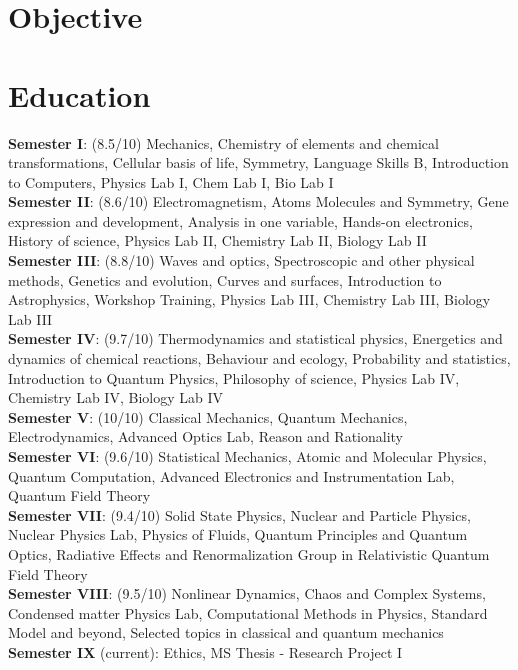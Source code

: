 \documentclass[11pt,a4paper,unicode]{moderncv}
\begin{document}
\maketitle


\section{Objective}

\section{Education}
	{
	\textbf{Semester I}: (8.5/10) Mechanics, Chemistry of elements and chemical transformations, Cellular basis of life, Symmetry, Language Skills B, Introduction to Computers, Physics Lab I, Chem Lab I, Bio Lab I\\
	\textbf{Semester II}: (8.6/10) Electromagnetism, Atoms Molecules and Symmetry, Gene expression and development, Analysis in one variable, Hands-on electronics, History of science, Physics Lab II, Chemistry Lab II, Biology Lab II\\
	\textbf{Semester III}: (8.8/10) Waves and optics, Spectroscopic and other physical methods, Genetics and evolution, Curves and surfaces, Introduction to Astrophysics, Workshop Training, Physics Lab III, Chemistry Lab III, Biology Lab III\\
	\textbf{Semester IV}: (9.7/10) Thermodynamics and statistical physics, Energetics and dynamics of chemical reactions, Behaviour and ecology, Probability and statistics, Introduction to Quantum Physics, Philosophy of science, Physics Lab IV, Chemistry Lab IV, Biology Lab IV\\
	\textbf{Semester V}: (10/10) Classical Mechanics, Quantum Mechanics, Electrodynamics, Advanced Optics Lab, Reason and Rationality\\
	\textbf{Semester VI}: (9.6/10) Statistical Mechanics, Atomic and Molecular Physics, Quantum Computation, Advanced Electronics and Instrumentation Lab, Quantum Field Theory\\
	\textbf{Semester VII}: (9.4/10) Solid State Physics, Nuclear and Particle Physics, Nuclear Physics Lab, Physics of Fluids, Quantum Principles and Quantum Optics,  Radiative Effects and Renormalization Group in Relativistic Quantum Field Theory\\
	\textbf{Semester VIII}: (9.5/10) Nonlinear Dynamics, Chaos and Complex Systems, Condensed matter Physics Lab, Computational Methods in Physics, Standard Model and beyond, Selected topics in classical and quantum mechanics \\
        \textbf{Semester IX} (current): Ethics, MS Thesis - Research Project I
	}
\end{document}
